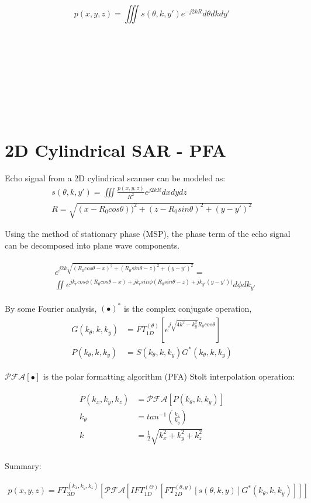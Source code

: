 \documentclass{article}
\begin{document}
\begin{equation}
p(x,y,z) = \iiint s(\theta,k,y')e^{-j2kR} d\theta dk dy'
\end{equation}
\\ \\ \\ \\ \\ \\ \\ \\

\section{2D Cylindrical SAR - PFA}

Echo signal from a 2D cylindrical scanner can be modeled as:
\begin{gather}
s(\theta,k,y') = \iiint \frac{p(x,y,z)}{R^2}e^{j2kR}dxdydz \\
R = \sqrt{(x - R_0cos\theta))^2 + (z - R_0sin\theta)^2 + (y - y')^2}
\end{gather}

Using the method of stationary phase (MSP), the phase term of the echo signal can be decomposed into plane wave components.

\begin{align}
\begin{split}
&e^{j2k\sqrt{(R_0cos\theta - x)^2 + (R_0sin\theta - z)^2 + (y - y')^2}} = \\ 
&\iint e^{jk_rcos\phi(R_0cos\theta - x) + jk_rsin\phi(R_0sin\theta - z) + jk_{y'}(y-y'))} d\phi dk_{y'}
\end{split}
\end{align}

By some Fourier analysis, $(\bullet)^*$ is the complex conjugate operation,
\begin{align}
	\begin{split}
	G(k_\theta,k,k_y) &= FT_{1D}^{(\theta)}\left[ e^{j\sqrt{4k^2 - k_y^2}R_0 cos\theta} \right] \\
	P(k_\theta,k,k_y) &= S(k_\theta,k,k_y)G^*(k_\theta,k,k_y) 
	\end{split}
\end{align}

$\mathcal{PFA}[\bullet]$ is the polar formatting algorithm (PFA) Stolt interpolation operation:

\begin{align}
	\begin{split}
		P(k_x,k_y,k_z) &= \mathcal{PFA}\left[ P(k_\theta,k,k_y) \right] \\
		k_\theta &= tan^{-1}\left( \frac{k_z}{k_y} \right) \\
		k &= \frac{1}{2} \sqrt{k_x^2 + k_y^2 + k_z^2} \\
	\end{split}
\end{align}

Summary:

\begin{gather}
p(x,y,z) = FT_{3D}^{(k_x,k_y,k_z)}\left[\mathcal{PFA}\left[IFT_{1D}^{(\Theta)}\left[ FT_{2D}^{(\theta,y)}\left[s(\theta,k,y)\right]G^*(k_\theta,k,k_y)\right]\right]\right]
\end{gather}
\end{document}
